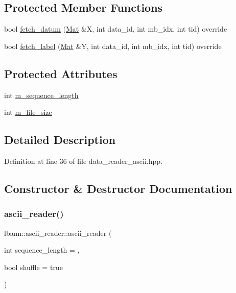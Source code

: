\subsection*{Protected Member Functions}
\begin{DoxyCompactItemize}
\item 
bool \hyperlink{classlbann_1_1ascii__reader_a5b56d66d5f2c175d580ef213c901fef0}{fetch\+\_\+datum} (\hyperlink{base_8hpp_a68f11fdc31b62516cb310831bbe54d73}{Mat} \&X, int data\+\_\+id, int mb\+\_\+idx, int tid) override
\item 
bool \hyperlink{classlbann_1_1ascii__reader_a361f883c71236c37dd2bc2dda5f00ef3}{fetch\+\_\+label} (\hyperlink{base_8hpp_a68f11fdc31b62516cb310831bbe54d73}{Mat} \&Y, int data\+\_\+id, int mb\+\_\+idx, int tid) override
\end{DoxyCompactItemize}
\subsection*{Protected Attributes}
\begin{DoxyCompactItemize}
\item 
int \hyperlink{classlbann_1_1ascii__reader_a5788fa7418a086de968929d0d4cb4fa4}{m\+\_\+sequence\+\_\+length}
\item 
int \hyperlink{classlbann_1_1ascii__reader_af684694c8c7faef296bf5af2530471f3}{m\+\_\+file\+\_\+size}
\end{DoxyCompactItemize}


\subsection{Detailed Description}


Definition at line 36 of file data\+\_\+reader\+\_\+ascii.\+hpp.



\subsection{Constructor \& Destructor Documentation}
\mbox{\label{classlbann_1_1ascii__reader_a5a7b563d58c20eeffad4e5e2a96734bb}} 
\subsubsection{\texorpdfstring{ascii\+\_\+reader()}{ascii\_reader()}\hspace{0.1cm}{\footnotesize\ttfamily [1/2]}}
{\footnotesize\ttfamily lbann\+::ascii\+\_\+reader\+::ascii\+\_\+reader (\begin{DoxyParamCaption}\item[{int}]{sequence\+\_\+length = {},  }\item[{bool}]{shuffle = {\ttfamily true} }\end{DoxyParamCaption})}



